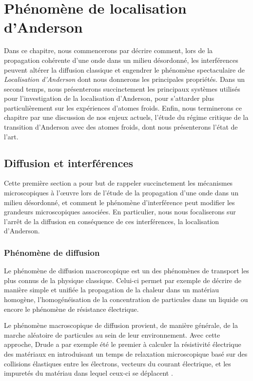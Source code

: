 \chapter{Phénomène de localisation d'Anderson} 
\label{ch:Localisation}

Dans ce chapitre, nous commencerons par décrire comment, lors de la propagation cohérente d'une onde dans un milieu désordonné, les interférences peuvent altérer la diffusion classique et engendrer le phénomène spectaculaire de \emph{Localisation d'Anderson} dont nous donnerons les principales propriétés. Dans un second temps, nous présenterons succinctement les principaux systèmes utilisés pour l'investigation de la localisation d'Anderson, pour s'attarder plus particulièrement sur les expériences d'atomes froids. Enfin, nous terminerons ce chapitre par une discussion de nos enjeux actuels, l'étude du régime critique de la transition d'Anderson avec des atomes froids, dont nous présenterons l'état de l'art.

\section{Diffusion et interférences}
Cette première section a pour but de rappeler succinctement les mécanismes microscopiques à l'œuvre lors de l'étude de la propagation d'une onde dans un milieu désordonné, et comment le phénomène d'interférence peut modifier les grandeurs microscopiques associées. En particulier, nous nous focaliserons sur l'arrêt de la diffusion en conséquence de ces interférences, la localisation d'Anderson.

\subsection{Phénomène de diffusion}
\label{sc:diffusion_classique}
Le phénomène de diffusion macroscopique est un des phénomènes de transport les plus connus de la physique classique. Celui-ci permet par exemple de décrire de manière simple et unifiée la propagation de la chaleur dans un matériau homogène, l'homogénéisation de la concentration de particules dans un liquide ou encore le phénomène de résistance électrique. 

Le phénomène macroscopique de diffusion provient, de manière générale, de la marche aléatoire de particules au sein de leur environnement. Avec cette approche, Drude a par exemple été le premier à calculer la résistivité électrique des matériaux en introduisant un temps de relaxation microscopique basé sur des collisions élastiques entre les électrons, vecteurs du courant électrique, et les impuretés du matériau dans lequel ceux-ci se déplacent \citep{ashcroft2010solid}. 

